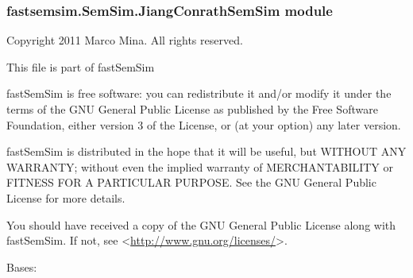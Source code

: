 \documentclass[letterpaper,10pt,english]{sphinxmanual}
\begin{document}
\subsubsection{fastsemsim.SemSim.JiangConrathSemSim module}
\label{fastsemsim.SemSim:module-fastsemsim.SemSim.JiangConrathSemSim}\label{fastsemsim.SemSim:fastsemsim-semsim-jiangconrathsemsim-module}
Copyright 2011 Marco Mina. All rights reserved.

This file is part of fastSemSim

fastSemSim is free software: you can redistribute it and/or modify
it under the terms of the GNU General Public License as published by
the Free Software Foundation, either version 3 of the License, or
(at your option) any later version.

fastSemSim is distributed in the hope that it will be useful,
but WITHOUT ANY WARRANTY; without even the implied warranty of
MERCHANTABILITY or FITNESS FOR A PARTICULAR PURPOSE.  See the
GNU General Public License for more details.

You should have received a copy of the GNU General Public License
along with fastSemSim.  If not, see \textless{}\href{http://www.gnu.org/licenses/}{http://www.gnu.org/licenses/}\textgreater{}.

\begin{fulllineitems}
\label{fastsemsim.SemSim:fastsemsim.SemSim.JiangConrathSemSim.JiangConrathSemSim}
Bases: {\hyperref[fastsemsim.SemSim:fastsemsim.SemSim.TermSemSim.TermSemSim]{}}

\begin{fulllineitems}
\label{fastsemsim.SemSim:fastsemsim.SemSim.JiangConrathSemSim.JiangConrathSemSim.IC_based}
\end{fulllineitems}


\begin{fulllineitems}
\label{fastsemsim.SemSim:fastsemsim.SemSim.JiangConrathSemSim.JiangConrathSemSim.SS_type}
\end{fulllineitems}


\end{fulllineitems}
\end{document}
